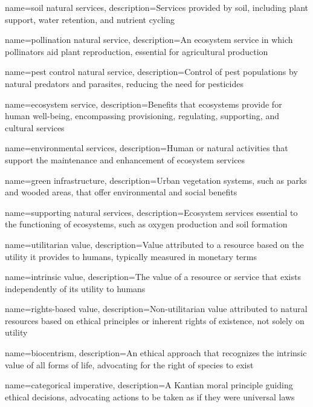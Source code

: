 {
	name=soil natural services,
	description={Services provided by soil, including plant support, water retention, and nutrient cycling}
}

{
	name=pollination natural service,
	description={An ecosystem service in which pollinators aid plant reproduction, essential for agricultural production}
}

{
	name=pest control natural service,
	description={Control of pest populations by natural predators and parasites, reducing the need for pesticides}
}

{
	name=ecosystem service,
	description={Benefits that ecosystems provide for human well-being, encompassing provisioning, regulating, supporting, and cultural services}
}

{
	name=environmental services,
	description={Human or natural activities that support the maintenance and enhancement of ecosystem services}
}

{
	name=green infrastructure,
	description={Urban vegetation systems, such as parks and wooded areas, that offer environmental and social benefits}
}

{
	name=supporting natural services,
	description={Ecosystem services essential to the functioning of ecosystems, such as oxygen production and soil formation}
}

{
	name=utilitarian value,
	description={Value attributed to a resource based on the utility it provides to humans, typically measured in monetary terms}
}

{
	name=intrinsic value,
	description={The value of a resource or service that exists independently of its utility to humans}
}

{
	name=rights-based value,
	description={Non-utilitarian value attributed to natural resources based on ethical principles or inherent rights of existence, not solely on utility}
}

{
	name=biocentrism,
	description={An ethical approach that recognizes the intrinsic value of all forms of life, advocating for the right of species to exist}
}

{
	name=categorical imperative,
	description={A Kantian moral principle guiding ethical decisions, advocating actions to be taken as if they were universal laws}
}

